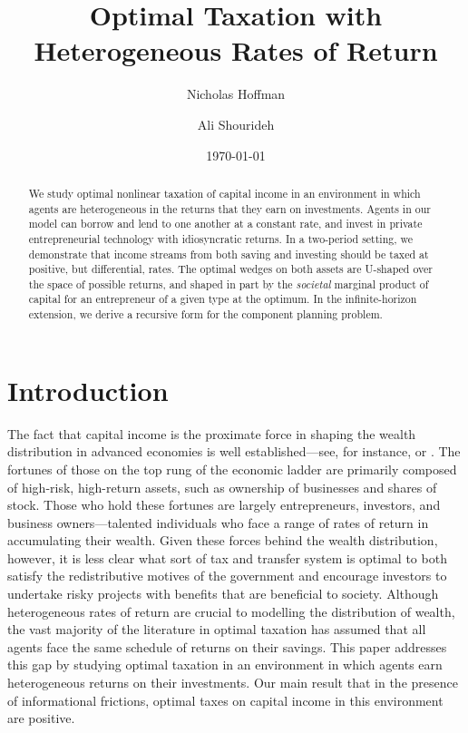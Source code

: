 \documentclass[11pt]{article}
\title{Optimal Taxation with Heterogeneous Rates of Return}
\author{
    Nicholas Hoffman\\
    \and 
    Ali Shourideh\\
}
\date{\today}
\begin{document}
\maketitle

\begin{abstract}
    We study optimal nonlinear taxation of capital income in an environment in which agents are heterogeneous in the returns that they earn on investments. Agents in our model can borrow and lend to one another at a constant rate, and invest in private entrepreneurial technology with idiosyncratic returns. In a two-period setting, we demonstrate that income streams from both saving and investing should be taxed at positive, but differential, rates. The optimal wedges on both assets are U-shaped over the space of possible returns, and shaped in part by the \textit{societal} marginal product of capital for an entrepreneur of a given type at the optimum. In the infinite-horizon extension, we derive a recursive form for the component planning problem.
\end{abstract}

\section{Introduction} \label{sec:intro}

The fact that capital income is the proximate force in shaping the wealth distribution in advanced economies is well established---see, for instance, \cite{benhabib2011distribution} or \cite{benhabib2019wealth}. The fortunes of those on the top rung of the economic ladder are primarily composed of high-risk, high-return assets, such as ownership of businesses and shares of stock. Those who hold these fortunes are largely entrepreneurs, investors, and business owners---talented individuals who face a range of rates of return in accumulating their wealth. Given these forces behind the wealth distribution, however, it is less clear what sort of tax and transfer system is optimal to both satisfy the redistributive motives of the government and encourage investors to undertake risky projects with benefits that are beneficial to society. Although heterogeneous rates of return are crucial to modelling the distribution of wealth, the vast majority of the literature in optimal taxation has assumed that all agents face the same schedule of returns on their savings. 
This paper addresses this gap by studying optimal taxation in an environment in which agents earn heterogeneous returns on their investments. Our main result that in the presence of informational frictions, optimal taxes on capital income in this environment are positive. 
\end{document}
